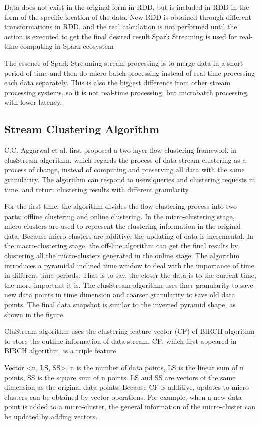 \documentclass[runningheads]{llncs}
\begin{document}
Data does not exist in the original form in RDD, but is included in RDD in the form of the specific location of the data. New RDD is obtained through different transformations in RDD, and the real calculation is not performed until the action is executed to get the final desired result.Spark Streaming is used for real-time computing in Spark ecosystem

The essence of Spark Streaming stream processing is to merge data in a short period of time and then do micro batch processing instead of real-time processing each data separately. This is also the biggest difference from other stream processing systems, so it is not real-time processing, but microbatch processing with lower latency.
\subsection{Stream Clustering Algorithm}
C.C. Aggarwal et al. first proposed a two-layer flow clustering framework in clusStream algorithm, which regards the process of data stream clustering as a process of change, instead of computing and preserving all data with the same granularity. The algorithm can respond to users'queries and clustering requests in time, and return clustering results with different granularity.

For the first time, the algorithm divides the flow clustering process into two parts: offline clustering and online clustering. In the micro-clustering stage, micro-clusters are used to represent the clustering information in the original data. Because micro-clusters are additive, the updating of data is incremental. In the macro-clustering stage, the off-line algorithm can get the final results by clustering all the micro-clusters generated in the online stage. The algorithm introduces a pyramidal inclined time window to deal with the importance of time in different time periods. That is to say, the closer the data is to the current time, the more important it is. The clusStream algorithm uses finer granularity to save new data points in time dimension and coarser granularity to save old data points. The final data snapshot is similar to the inverted pyramid shape, as shown in the figure.

CluStream algorithm uses the clustering feature vector (CF) of BIRCH algorithm to store the outline information of data stream. CF, which first appeared in BIRCH algorithm, is a triple feature

Vector <n, LS, SS>, n is the number of data points, LS is the linear sum of n points, SS is the square sum of n points. LS and SS are vectors of the same dimension as the original data points. Because CF is additive, updates to micro clusters can be obtained by vector operations. For example, when a new data point is added to a micro-cluster, the general information of the micro-cluster can be updated by adding vectors.
\end{document}
